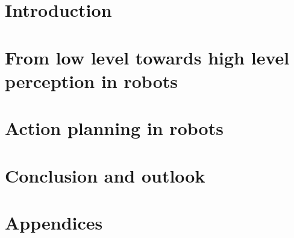 \documentclass[
  fulldocument,       %
  printversion,       %
]{phd-goe}
\begin{document}
\glsresetall
\chapter{Introduction}
\setcounter{page}{1}



\chapter{From low level towards high level perception in robots}
\label{cha:perception}





\chapter{Action planning in robots}
\label{cha:action}











\chapter{Conclusion and outlook}




\setlength{\emergencystretch}{3em}
\printbibliography[segment=\therefsegment, notcategory=ignore]


\appendix
\chapter{Appendices}




\onlyindraft{
  \listoftodos[Notes]
}
\end{document}
